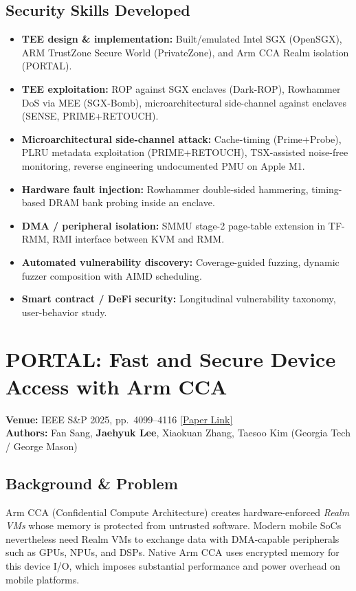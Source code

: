 \documentclass[11pt,letterpaper]{article}
\begin{document}
\subsection*{Security Skills Developed}
\begin{itemize}
    \item \textbf{TEE design \& implementation:} Built/emulated Intel SGX (OpenSGX), ARM TrustZone Secure World (PrivateZone), and Arm CCA Realm isolation (PORTAL).
    \item \textbf{TEE exploitation:} ROP against SGX enclaves (Dark-ROP), Rowhammer DoS via MEE (SGX-Bomb), microarchitectural side-channel against enclaves (SENSE, PRIME+RETOUCH).
    \item \textbf{Microarchitectural side-channel attack:} Cache-timing (Prime+Probe), PLRU metadata exploitation (PRIME+RETOUCH), TSX-assisted noise-free monitoring, reverse engineering undocumented PMU on Apple M1.
    \item \textbf{Hardware fault injection:} Rowhammer double-sided hammering, timing-based DRAM bank probing inside an enclave.
    \item \textbf{DMA / peripheral isolation:} SMMU stage-2 page-table extension in TF-RMM, RMI interface between KVM and RMM.
    \item \textbf{Automated vulnerability discovery:} Coverage-guided fuzzing, dynamic fuzzer composition with AIMD scheduling.
    \item \textbf{Smart contract / DeFi security:} Longitudinal vulnerability taxonomy, user-behavior study.
\end{itemize}

\newpage

\section{PORTAL: Fast and Secure Device Access with Arm CCA}
\textbf{Venue:} IEEE S\&P 2025, pp.\ 4099--4116 \hfill
\href{https://www.computer.org/csdl/proceedings-article/sp/2025/223600a013/21B7Q5c3ZHq}{[Paper Link]}\\
\textbf{Authors:} Fan Sang, \textbf{Jaehyuk Lee}, Xiaokuan Zhang, Taesoo Kim (Georgia Tech / George Mason)

\subsection*{Background \& Problem}
Arm CCA (Confidential Compute Architecture) creates hardware-enforced \emph{Realm VMs} whose memory is protected from untrusted software.
Modern mobile SoCs nevertheless need Realm VMs to exchange data with DMA-capable peripherals such as GPUs, NPUs, and DSPs.
Native Arm CCA uses encrypted memory for this device I/O, which imposes substantial performance and power overhead on mobile platforms.
\end{document}
